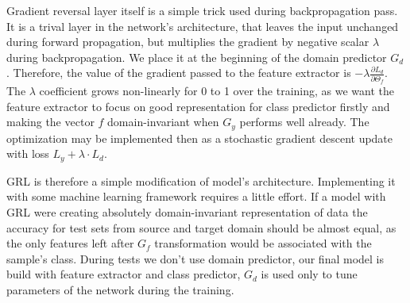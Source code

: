 \documentclass{article}
\begin{document}
Gradient reversal layer itself is a simple trick used during backpropagation pass. It is a trival layer in the network's architecture, that leaves the input unchanged during forward propagation, but multiplies the gradient by negative scalar $\lambda$ during backpropagation. We place it at the beginning of the domain predictor $G_{d}$. Therefore, the value of the gradient passed to the feature extractor is $-\lambda \frac{\partial L_{d}}{\partial \Theta_{f}}$. The $\lambda$ coefficient grows non-linearly for 0 to 1 over the training, as we want the feature extractor to focus on good representation for class predictor firstly and making the vector $f$ domain-invariant when $G_{y}$ performs well already. The optimization may be implemented then as a stochastic gradient descent update with loss $L_{y} + \lambda \cdot L_{d}$. 
\par
GRL is therefore a simple modification of model's architecture. Implementing it with some machine learning framework requires a little effort. If a model with GRL were creating absolutely domain-invariant representation of data the accuracy for test sets from source and target domain should be almost equal, as the only features left after $G_{f}$ transformation would be associated with the sample's class. During tests we don't use domain predictor, our final model is build with feature extractor and class predictor, $G_{d}$ is used only to tune parameters of the network during the training.
\end{document}
